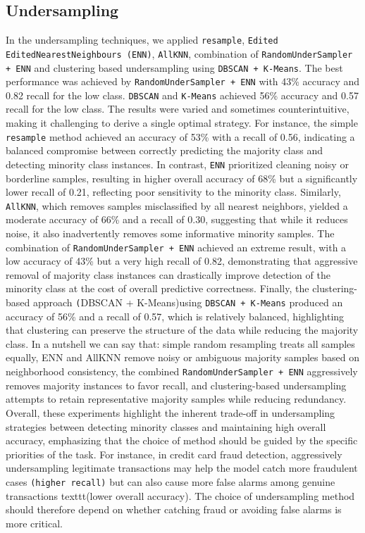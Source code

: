 \subsection{Undersampling}
In the undersampling techniques, we applied \texttt{resample}, \texttt{Edited EditedNearestNeighbours (ENN)}, 
\texttt{AllKNN}, combination of \texttt{RandomUnderSampler + ENN} and clustering based undersampling using \texttt{DBSCAN + K-Means}.
The best performance was achieved by \texttt{RandomUnderSampler + ENN} with 43\% accuracy and 0.82 recall for the low class.
\texttt{DBSCAN} and \texttt{K-Means} achieved 56\% accuracy and 0.57 recall for the low class.
The results were varied and sometimes counterintuitive, 
making it challenging to derive a single optimal strategy. For instance, the simple \texttt{resample} method achieved an accuracy of 53\% with a recall of 0.56, 
 indicating a balanced compromise between correctly predicting the majority class and detecting minority class instances. 
 In contrast, \texttt{ENN} prioritized cleaning noisy or borderline samples, resulting in higher overall accuracy of 68\% but a significantly lower recall of 0.21, 
 reflecting poor sensitivity to the minority class. 
 Similarly, \texttt{AllKNN}, which removes samples misclassified by all nearest neighbors, yielded a moderate accuracy of 66\% and a recall of 0.30, 
 suggesting that while it reduces noise, it also inadvertently removes some informative minority samples. 
 The combination of \texttt{RandomUnderSampler + ENN} achieved an extreme result, with a low accuracy of 43\% but a very high recall of 0.82, 
 demonstrating that aggressive removal of majority class instances can drastically improve detection of the minority class at the cost of 
 overall predictive correctness. Finally, the clustering-based approach \texttt(DBSCAN + K-Means)using \texttt{DBSCAN + K-Means} produced an accuracy of 56\% and a recall of 0.57, 
 which is relatively balanced, highlighting that clustering can preserve the structure of the data while reducing the majority class. 
 In a nutshell we can say that: 
 simple random resampling treats all samples equally, ENN and AllKNN remove noisy or ambiguous majority samples based on neighborhood consistency, 
 the combined \texttt{RandomUnderSampler + ENN} aggressively removes majority instances to favor recall, 
 and clustering-based undersampling attempts to retain representative majority samples while reducing redundancy. Overall, these experiments highlight the inherent 
 trade-off in undersampling strategies between detecting minority classes 
 and maintaining high overall accuracy, emphasizing that the choice of method should be guided by the specific priorities of the task.
 For instance, in credit card fraud detection, aggressively undersampling legitimate transactions may help the model catch more fraudulent cases \texttt{(higher recall)}
 but can also cause more false alarms among genuine transactions texttt{(lower overall accuracy)}. 
 The choice of undersampling method should therefore depend on whether catching fraud or avoiding false alarms is more critical.



